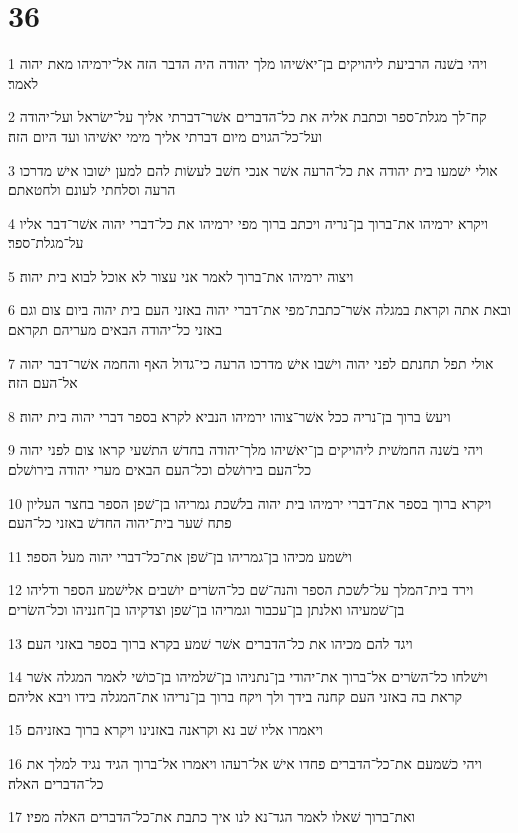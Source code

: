 \chapter{36}

\par 1 ויהי בשׁנה הרביעת ליהויקים בן־יאשׁיהו מלך יהודה היה הדבר הזה אל־ירמיהו מאת יהוה לאמר׃
\par 2 קח־לך מגלת־ספר וכתבת אליה את כל־הדברים אשׁר־דברתי אליך על־ישׂראל ועל־יהודה ועל־כל־הגוים מיום דברתי אליך מימי יאשׁיהו ועד היום הזה׃
\par 3 אולי ישׁמעו בית יהודה את כל־הרעה אשׁר אנכי חשׁב לעשׂות להם למען ישׁובו אישׁ מדרכו הרעה וסלחתי לעונם ולחטאתם׃
\par 4 ויקרא ירמיהו את־ברוך בן־נריה ויכתב ברוך מפי ירמיהו את כל־דברי יהוה אשׁר־דבר אליו על־מגלת־ספר׃
\par 5 ויצוה ירמיהו את־ברוך לאמר אני עצור לא אוכל לבוא בית יהוה׃
\par 6 ובאת אתה וקראת במגלה אשׁר־כתבת־מפי את־דברי יהוה באזני העם בית יהוה ביום צום וגם באזני כל־יהודה הבאים מעריהם תקראם׃
\par 7 אולי תפל תחנתם לפני יהוה וישׁבו אישׁ מדרכו הרעה כי־גדול האף והחמה אשׁר־דבר יהוה אל־העם הזה׃
\par 8 ויעשׂ ברוך בן־נריה ככל אשׁר־צוהו ירמיהו הנביא לקרא בספר דברי יהוה בית יהוה׃
\par 9 ויהי בשׁנה החמשׁית ליהויקים בן־יאשׁיהו מלך־יהודה בחדשׁ התשׁעי קראו צום לפני יהוה כל־העם בירושׁלם וכל־העם הבאים מערי יהודה בירושׁלם׃
\par 10 ויקרא ברוך בספר את־דברי ירמיהו בית יהוה בלשׁכת גמריהו בן־שׁפן הספר בחצר העליון פתח שׁער בית־יהוה החדשׁ באזני כל־העם׃
\par 11 וישׁמע מכיהו בן־גמריהו בן־שׁפן את־כל־דברי יהוה מעל הספר׃
\par 12 וירד בית־המלך על־לשׁכת הספר והנה־שׁם כל־השׂרים יושׁבים אלישׁמע הספר ודליהו בן־שׁמעיהו ואלנתן בן־עכבור וגמריהו בן־שׁפן וצדקיהו בן־חנניהו וכל־השׂרים׃
\par 13 ויגד להם מכיהו את כל־הדברים אשׁר שׁמע בקרא ברוך בספר באזני העם׃
\par 14 וישׁלחו כל־השׂרים אל־ברוך את־יהודי בן־נתניהו בן־שׁלמיהו בן־כושׁי לאמר המגלה אשׁר קראת בה באזני העם קחנה בידך ולך ויקח ברוך בן־נריהו את־המגלה בידו ויבא אליהם׃
\par 15 ויאמרו אליו שׁב נא וקראנה באזנינו ויקרא ברוך באזניהם׃
\par 16 ויהי כשׁמעם את־כל־הדברים פחדו אישׁ אל־רעהו ויאמרו אל־ברוך הגיד נגיד למלך את כל־הדברים האלה׃
\par 17 ואת־ברוך שׁאלו לאמר הגד־נא לנו איך כתבת את־כל־הדברים האלה מפיו׃
